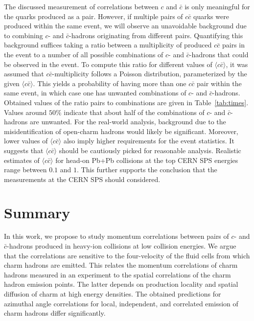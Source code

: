 \documentclass[floatfix,superscriptaddress,a4paper,
               showpieces,showkeys,nofootinbib,preprint]{revtex4-2}
\begin{document}
The discussed measurement of correlations between $c$ and $\bar{c}$ is only meaningful for the quarks produced as a pair. However, if multiple pairs of $c\bar{c}$ quarks were produced within the same event, we will observe an unavoidable background due to combining $c$- and $\bar{c}$-hadrons originating from different pairs. Quantifying this background suffices taking a ratio between  a multiplicity  of produced $c\bar{c}$ pairs in the event to a number of all possible combinations of $c$- and $\bar{c}$-hadrons that could be observed in the event. To compute this ratio for different values of $\langle c\bar{c} \rangle$, it was assumed that $c\bar{c}$-multiplicity follows a Poisson distribution, parameterized by the given $\langle c\bar{c} \rangle$. This yields a probability of having more than one $c\bar{c}$ pair within the same event, in which case one has unwanted combinations of $c$- and $\bar{c}$-hadrons. Obtained values of the ratio pairs to combinations are given in Table~\ref{tab:times}. Values around $50\%$ indicate that about half of the combinations of $c$- and $\bar{c}$-hadrons are unwanted. For the real-world analysis, background due to the misidentification of open-charm hadrons would likely be significant. Moreover, lower values of $\langle c\bar{c} \rangle$ also imply higher requirements for the event statistics. It suggests that $\langle c\bar{c} \rangle$ should be cautiously picked for reasonable analysis. Realistic estimates of $\langle c\bar{c} \rangle$ for head-on Pb+Pb collisions at the top CERN SPS energies range between $0.1$ and $1$.
This further supports the conclusion that the measurements at the CERN SPS should 
considered.

\clearpage

\section{Summary}
\label{sec:summary}

In this work, we propose to study momentum correlations between pairs of $c$- and $\bar{c}$-hadrons produced in heavy-ion collisions at low collision energies. 
We argue that the correlations are sensitive to the four-velocity of the fluid cells from which charm hadrons are emitted. This relates the momentum correlations of charm hadrons measured in an experiment to the spatial correlations of the charm hadron emission points. The latter depends on production locality and spatial diffusion of charm at high energy densities. The obtained predictions for azimuthal angle correlations for local, independent, and correlated emission of charm hadrons differ 
significantly.
\end{document}
